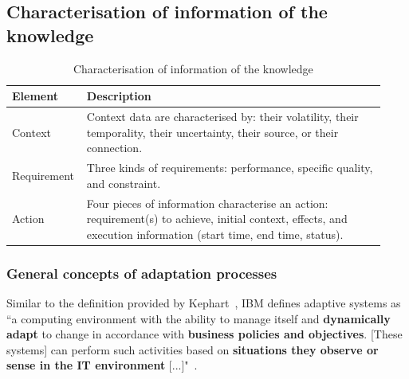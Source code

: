 %

\subsection{Characterisation of information of the knowledge}

\begin{table}
		\centering
    	\begin{tabular}{p{0.15\linewidth}p{0.78\linewidth}}
    		\hline
    		\textbf{Element} & \textbf{Description} \\
    		\hline
    		Context & Context data are characterised by: their volatility, their temporality, their uncertainty, their source, or their connection.\\
    		Requirement & Three kinds of requirements: performance, specific quality, and constraint. \\
    		Action & Four pieces of information characterise an action: requirement(s) to achieve, initial context, effects, and execution information (start time, end time, status).\\
    		\hline
    	\end{tabular}
    	\caption{Characterisation of information of the knowledge}
    	\label{table:background:adptSyst:charc}
\end{table}


\subsubsection{General concepts of adaptation processes}

Similar to the definition provided by Kephart~\cite{DBLP:journals/computer/KephartC03}, IBM  defines adaptive systems as ``a computing environment with the ability to manage itself and \textbf{dynamically adapt} to change in accordance with \textbf{business policies and objectives}. [These systems] can perform such activities based on \textbf{situations they observe or sense in the IT environment} [...]"~\cite{computing2006architectural}.

